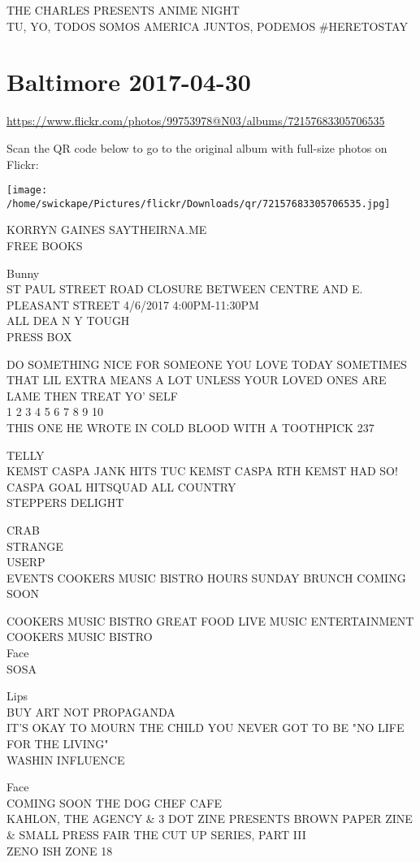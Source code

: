 \documentclass[10pt,letterpaper]{article}
\begin{document}
THE CHARLES PRESENTS ANIME NIGHT\\
TU, YO, TODOS SOMOS AMERICA JUNTOS, PODEMOS \#HERETOSTAY


\section*{Baltimore 2017-04-30}

\url{https://www.flickr.com/photos/99753978@N03/albums/72157683305706535}

Scan the QR code below to go to the original album with full-size photos on Flickr:

\texttt{[image: /home/swickape/Pictures/flickr/Downloads/qr/72157683305706535.jpg]}


KORRYN GAINES SAYTHEIRNA.ME\\
FREE BOOKS

Bunny\\
ST PAUL STREET ROAD CLOSURE BETWEEN CENTRE AND E. PLEASANT STREET 4/6/2017 4:00PM{-}11:30PM\\
ALL DEA N Y TOUGH\\
PRESS BOX

DO SOMETHING NICE FOR SOMEONE YOU LOVE TODAY SOMETIMES THAT LIL EXTRA MEANS A LOT UNLESS YOUR LOVED ONES ARE LAME THEN TREAT YO' SELF\\
1 2 3 4 5 6 7 8 9 10\\
THIS ONE HE WROTE IN COLD BLOOD WITH A TOOTHPICK 237

TELLY\\
KEMST CASPA JANK HITS TUC KEMST CASPA RTH KEMST HAD SO!  CASPA GOAL HITSQUAD ALL COUNTRY\\
STEPPERS DELIGHT

CRAB\\
STRANGE\\
USERP\\
EVENTS COOKERS MUSIC BISTRO HOURS SUNDAY BRUNCH COMING SOON

COOKERS MUSIC BISTRO GREAT FOOD LIVE MUSIC ENTERTAINMENT\\
COOKERS MUSIC BISTRO\\
Face\\
SOSA

Lips\\
BUY ART NOT PROPAGANDA\\
IT'S OKAY TO MOURN THE CHILD YOU NEVER GOT TO BE "NO LIFE FOR THE LIVING"\\
WASHIN INFLUENCE

Face\\
COMING SOON THE DOG CHEF CAFE\\
KAHLON, THE AGENCY \& 3 DOT ZINE PRESENTS BROWN PAPER ZINE \& SMALL PRESS FAIR THE CUT UP SERIES, PART III\\
ZENO ISH ZONE 18
\end{document}
